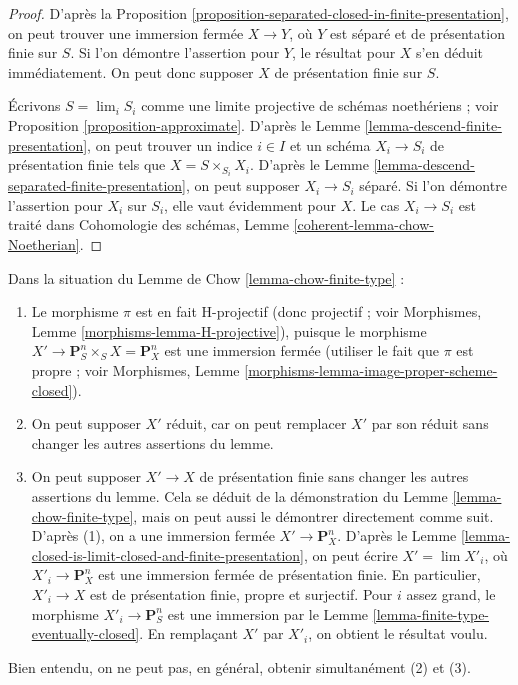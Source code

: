 \begin{proof}
D'après la Proposition \ref{proposition-separated-closed-in-finite-presentation},
on peut trouver une immersion fermée $X \to Y$, où $Y$ est séparé
et de présentation finie sur $S$. Si l'on démontre l'assertion
pour $Y$, le résultat pour $X$ s'en déduit immédiatement. On peut donc supposer
$X$ de présentation finie sur $S$.

\medskip\noindent
Écrivons $S = \lim_i S_i$ comme une limite projective de schémas noethériens ; voir
Proposition \ref{proposition-approximate}. D'après le
Lemme \ref{lemma-descend-finite-presentation}, on peut
trouver un indice $i \in I$ et un schéma $X_i \to S_i$ de présentation finie
tels que $X = S \times_{S_i} X_i$.
D'après le Lemme \ref{lemma-descend-separated-finite-presentation},
on peut supposer $X_i \to S_i$ séparé.
Si l'on démontre l'assertion pour
$X_i$ sur $S_i$, elle vaut évidemment pour $X$. Le cas
$X_i \to S_i$ est traité dans
Cohomologie des schémas, Lemme \ref{coherent-lemma-chow-Noetherian}.
\end{proof}

\begin{remark}
\label{remark-chow-finite-type}
Dans la situation du Lemme de Chow \ref{lemma-chow-finite-type} :
\begin{enumerate}
\item Le morphisme $\pi$ est en fait H-projectif (donc projectif ; voir
Morphismes, Lemme \ref{morphisms-lemma-H-projective}),
puisque le morphisme $X' \to \mathbf{P}^n_S \times_S X = \mathbf{P}^n_X$
est une immersion fermée (utiliser le fait que $\pi$ est propre ; voir
Morphismes, Lemme \ref{morphisms-lemma-image-proper-scheme-closed}).
\item On peut supposer $X'$ réduit, car on peut remplacer $X'$ par
son réduit sans changer les autres assertions du lemme.
\item On peut supposer $X' \to X$ de présentation finie
sans changer les autres assertions du lemme. Cela se déduit
de la démonstration du Lemme \ref{lemma-chow-finite-type}, mais on peut aussi le démontrer
directement comme suit. D'après (1), on a une immersion fermée
$X' \to \mathbf{P}^n_X$. D'après le
Lemme \ref{lemma-closed-is-limit-closed-and-finite-presentation}, on peut écrire
$X' = \lim X'_i$, où $X'_i \to \mathbf{P}^n_X$ est une immersion
fermée de présentation finie. En particulier, $X'_i \to X$ est
de présentation finie, propre et surjectif. Pour
$i$ assez grand, le morphisme $X'_i \to \mathbf{P}^n_S$ est une immersion par le
Lemme \ref{lemma-finite-type-eventually-closed}. En remplaçant
$X'$ par $X'_i$, on obtient le résultat voulu.
\end{enumerate}
Bien entendu, on ne peut pas, en général, obtenir simultanément (2) et (3).
\end{remark}

